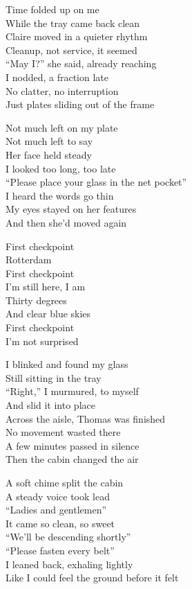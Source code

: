 \begin{lyrics}
Time folded up on me\\
While the tray came back clean\\
Claire moved in a quieter rhythm\\
Cleanup, not service, it seemed\\
“May I?” she said, already reaching\\
I nodded, a fraction late\\
No clatter, no interruption\\
Just plates sliding out of the frame

Not much left on my plate\\
Not much left to say\\
Her face held steady\\
I looked too long, too late\\
“Please place your glass in the net pocket”\\
I heard the words go thin\\
My eyes stayed on her features\\
And then she’d moved again

First checkpoint\\
Rotterdam\\
First checkpoint\\
I’m still here, I am\\
Thirty degrees\\
And clear blue skies\\
First checkpoint\\
I’m not surprised

I blinked and found my glass\\
Still sitting in the tray\\
“Right,” I murmured, to myself\\
And slid it into place\\
Across the aisle, Thomas was finished\\
No movement wasted there\\
A few minutes passed in silence\\
Then the cabin changed the air

A soft chime split the cabin\\
A steady voice took lead\\
“Ladies and gentlemen”\\
It came so clean, so sweet\\
“We’ll be descending shortly”\\
“Please fasten every belt”\\
I leaned back, exhaling lightly\\
Like I could feel the ground before it felt


\end{lyrics}
